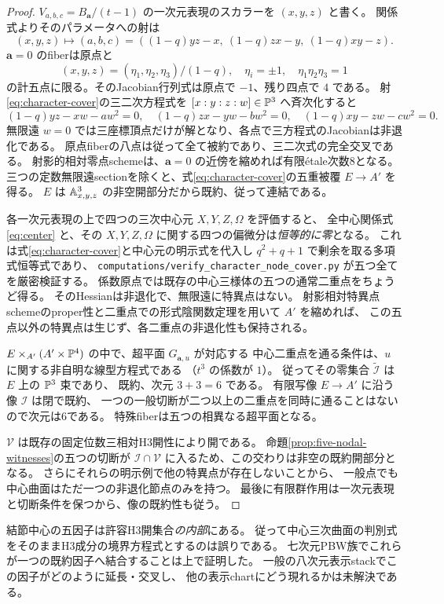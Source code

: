 \begin{proof}
$V_{a,b,c}=B_{\mathbf a}/(t-1)$ の一次元表現のスカラーを $(x,y,z)$ と書く。
関係式よりそのパラメータへの射は
\begin{equation}\label{eq:character-cover}
 (x,y,z)\longmapsto(a,b,c)
  =((1-q)yz-x,\ (1-q)zx-y,\ (1-q)xy-z).
\end{equation}
$\mathbf a=0$ のfiberは原点と
\[
 (x,y,z)=(\eta_1,\eta_2,\eta_3)/(1-q),
 \quad\eta_i=\pm1,\quad\eta_1\eta_2\eta_3=1
\]
の計五点に限る。そのJacobian行列式は原点で $-1$、残り四点で $4$ である。
射\eqref{eq:character-cover}の三二次方程式を $[x:y:z:w]\in\PP^3$ へ斉次化すると
\[
 (1-q)yz-xw-aw^2=0,\quad
 (1-q)zx-yw-bw^2=0,\quad
 (1-q)xy-zw-cw^2=0.
\]
無限遠 $w=0$ では三座標頂点だけが解となり、各点で三方程式のJacobianは非退化である。
原点fiberの八点は従って全て被約であり、三二次式の完全交叉である。
射影的相対零点schemeは、$\mathbf a=0$ の近傍を縮めれば有限\'{e}tale次数8となる。
三つの定数無限遠sectionを除くと、式\eqref{eq:character-cover}の五重被覆 $E\to A'$ を得る。
$E$ は $\AA^3_{x,y,z}$ の非空開部分だから既約、従って連結である。

各一次元表現の上で四つの三次中心元 $X,Y,Z,\Omega$ を評価すると、
全中心関係式\eqref{eq:center} と、その
$X,Y,Z,\Omega$ に関する四つの偏微分は\emph{恒等的に零}となる。
これは式\eqref{eq:character-cover}と中心元の明示式を代入し
$q^2+q+1$ で剰余を取る多項式恒等式であり、
\texttt{computations/verify\_character\_node\_cover.py} が五つ全てを厳密検証する。
係数原点では既存の中心三様体の五つの通常二重点をちょうど得る。
そのHessianは非退化で、無限遠に特異点はない。
射影相対特異点schemeのproper性と二重点での形式陰関数定理を用いて $A'$ を縮めれば、
この五点以外の特異点は生じず、各二重点の非退化性も保持される。

$E\times_{A'}(A'\times\PP^4)$ の中で、超平面 $G_{\mathbf a,u}$ が対応する
中心二重点を通る条件は、$u$ に関する非自明な線型方程式である
（$t^3$ の係数が $1$）。
従ってその零集合 $\widetilde{\mathcal I}$ は $E$ 上の $\PP^3$ 束であり、
既約、次元 $3+3=6$ である。
有限写像 $E\to A'$ に沿う像 $\mathcal I$ は閉で既約、
一つの一般切断が二つ以上の二重点を同時に通ることはないので次元は6である。
特殊fiberは五つの相異なる超平面となる。

$\mathcal V$ は既存の固定位数三相対H3開性により開である。
命題\ref{prop:five-nodal-witnesses}の五つの切断が
$\mathcal I\cap\mathcal V$ に入るため、この交わりは非空の既約開部分となる。
さらにそれらの明示例で他の特異点が存在しないことから、
一般点でも中心曲面はただ一つの非退化節点のみを持つ。
最後に有限群作用は一次元表現と切断条件を保つから、像の既約性も従う。
\end{proof}

\begin{remark}[変形と境界の解釈]
結節中心の五因子は許容H3開集合\emph{の内部}にある。
従って中心三次曲面の判別式をそのままH3成分の境界方程式とするのは誤りである。
七次元PBW族でこれらが一つの既約因子へ結合することは上で証明した。
一般の八次元表示stackでこの因子がどのように延長・交叉し、
他の表示chartにどう現れるかは未解決である。
\end{remark}
